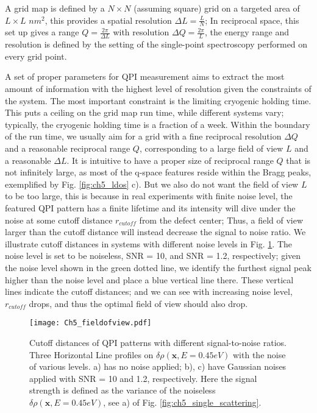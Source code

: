 A grid map is defined by a $N\times N$ (assuming square) grid on a targeted area of $L \times L$ $nm^2$, this provides a spatial resolution $\Delta L = \frac{L}{N}$; In reciprocal space, this set up gives a range $Q = \frac{2 \pi}{\Delta L}$ with resolution $\Delta Q = \frac{2\pi}{L}$, the energy range and resolution is defined by the setting of the single-point spectroscopy performed on every grid point. 

A set of proper parameters for \ac{QPI} measurement aims to extract the most amount of information with the highest level of resolution given the constraints of the system. The most important constraint is the limiting cryogenic holding time. This puts a ceiling on the grid map run time, while different systems vary; typically, the cryogenic holding time is a fraction of a week. Within the boundary of the run time, we usually aim for a grid with a fine reciprocal resolution $\Delta Q$ and a reasonable reciprocal range $Q$, corresponding to a large field of view $L$ and a reasonable $\Delta L$. It is intuitive to have a proper size of reciprocal range $Q$ that is not infinitely large, as most of the q-space features reside within the Bragg peaks, exemplified by Fig. \ref{fig:ch5_ldos} c). But we also do not want the field of view $L$ to be too large, this is because in real experiments with finite noise level, the featured \ac{QPI} pattern has a finite lifetime and its intensity will dive under the noise at some cutoff distance $r_{cutoff}$ from the defect center; Thus, a field of view larger than the cutoff distance will instead decrease the signal to noise ratio. We illustrate cutoff distances in systems with different noise levels in Fig. \ref{fig:ch5_cutoff}. The noise level is set to be noiseless, SNR = 10, and SNR = 1.2, respectively; given the noise level shown in the green dotted line, we identify the furthest signal peak higher than the noise level and place a blue vertical line there. These vertical lines indicate the cutoff distances; and we can see with increasing noise level, $r_{cutoff}$ drops, and thus the optimal field of view should also drop.  

\begin{figure}
	\texttt{[image: Ch5\_fieldofview.pdf]} 
	\centering
	\caption{Cutoff distances of QPI patterns with different signal-to-noise ratios. Three Horizontal Line profiles on $\delta\rho(\textbf{x}, E=0.45eV)$ with the noise of various levels. a) has no noise applied; b), c) have Gaussian noises applied with SNR = 10 and 1.2, respectively. Here the signal strength is defined as the variance of the noiseless $\delta\rho(\textbf{x}, E=0.45eV)$, see a) of Fig. \ref{fig:ch5_single_scattering}.}
	\label{fig:ch5_cutoff}
\end{figure}



